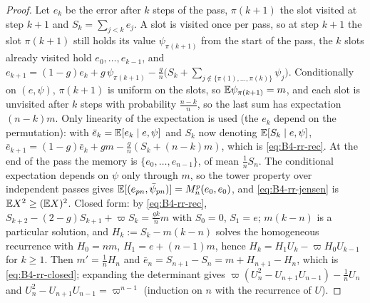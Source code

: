 \begin{proof}
Let $e_k$ be the error after $k$ steps of the pass, $\pi(k+1)$ the slot visited at step $k+1$ and $S_k=\sum_{j<k}e_j$. A slot is visited once per pass, so at step $k+1$ the slot $\pi(k+1)$ still holds its value $\psi_{\pi(k+1)}$ from the start of the pass, the $k$ slots already visited hold $e_0,\dots,e_{k-1}$, and
$e_{k+1}=(1-g)e_k+g\,\psi_{\pi(k+1)}-\frac gn\big(S_k+\sum_{j\notin\{\pi(1),\dots,\pi(k)\}}\psi_j\big)$.
Conditionally on $(e,\psi)$, $\pi(k+1)$ is uniform on the slots, so $\mathbb{E}\psi_{\pi(k+1)}=m$, and each slot is unvisited after $k$ steps with probability $\frac{n-k}n$, so the last sum has expectation $(n-k)m$. Only linearity of the expectation is used (the $e_k$ depend on the permutation): with $\bar e_k=\mathbb{E}[e_k\mid e,\psi]$ and $S_k$ now denoting $\mathbb{E}[S_k\mid e,\psi]$, $\bar e_{k+1}=(1-g)\bar e_k+gm-\frac gn(S_k+(n-k)m)$, which is \eqref{eq:B4-rr-rec}. At the end of the pass the memory is $\{e_0,\dots,e_{n-1}\}$, of mean $\frac1nS_n$. The conditional expectation depends on $\psi$ only through $m$, so the tower property over independent passes gives $\mathbb{E}[(e_{pn},\bar\psi_{pn})]=M_n^p(e_0,e_0)$, and \eqref{eq:B4-rr-jensen} is $\mathbb{E} X^2\ge(\mathbb{E} X)^2$.
Closed form: by \eqref{eq:B4-rr-rec}, $S_{k+2}-(2-g)S_{k+1}+\varpi S_k=\frac{gk}nm$ with $S_0=0$, $S_1=e$; $m(k-n)$ is a particular solution, and $H_k:=S_k-m(k-n)$ solves the homogeneous recurrence with $H_0=nm$, $H_1=e+(n-1)m$, hence $H_k=H_1U_k-\varpi H_0U_{k-1}$ for $k\ge1$. Then $m'=\frac1nH_n$ and $\bar e_n=S_{n+1}-S_n=m+H_{n+1}-H_n$, which is \eqref{eq:B4-rr-closed}; expanding the determinant gives $\varpi(U_n^2-U_{n+1}U_{n-1})-\frac1nU_n$ and $U_n^2-U_{n+1}U_{n-1}=\varpi^{n-1}$ (induction on $n$ with the recurrence of $U$).
\end{proof}

